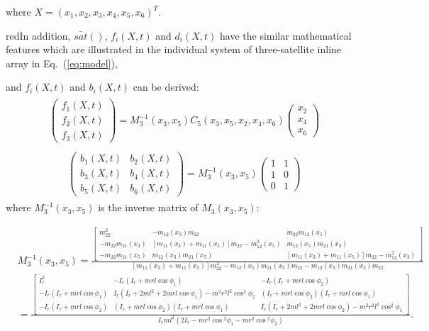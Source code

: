 where $X = (x_1,x_2,x_3,x_4,x_5,x_6)^T$. \begin{color}{red}In addition, $\bar{sat}()$, $f_i(X,t)$ and $d_i(X,t)$ have the similar mathematical features which are illustrated in the individual system of three-satellite inline array in Eq.~(\ref{eq:model}),\end{color} and $f_i(X,t)$ and $b_i(X,t)$ can be derived:
\begin{align}
\begin{split}
\begin{pmatrix}
f_1(X,t)\\
f_2(X,t)\\
f_3(X,t)
\end{pmatrix}=
M_3^{-1}(x_3,x_5)C_5(x_3,x_5,x_2,x_4,x_6)
\begin{pmatrix}
x_2\\
x_4\\
x_6
\end{pmatrix}
\end{split}
\end{align}
\begin{align}
\begin{split}
\begin{pmatrix}
b_1(X,t)&b_2(X,t)\\
b_3(X,t)&b_4(X,t)\\
b_5(X,t)&b_6(X,t)
\end{pmatrix}=
M_3^{-1}(x_3,x_5)
\begin{pmatrix}
1 &1\\
1 &0\\
0 &1
\end{pmatrix}
\end{split}
\end{align}
where $M_3^{-1}(x_3,x_5)$ is the inverse matrix of $M_3(x_3,x_5)$:
\begin{footnotesize}
\begin{align*}
&M_3^{-1}(x_3,x_5)
=\frac{\begin{bmatrix}
m_{22}^2 &-m_{12}(x_3)m_{22} &m_{22}m_{12}(x_5)\\
-m_{22}m_{21}(x_3) &[m_{11}(x_3)+m_{11}(x_5)]m_{22}-m_{12}^2(x_5) &m_{12}(x_5)m_{21}(x_3)\\
-m_{22}m_{21}(x_5) &m_{12}(x_3)m_{21}(x_5) &[m_{11}(x_3)+m_{11}(x_5)]m_{22}-m_{12}^2(x_3)
\end{bmatrix}}{[m_{11}(x_3)+m_{11}(x_5)]m_{22}^2-m_{12}(x_5)m_{21}(x_5)m_{22}-m_{12}(x_3)m_{21}(x_3)m_{22}}\\
&=\frac{\begin{bmatrix}
I_r^2 &-I_r(I_r+mrl\cos\phi_1) &-I_r(I_r+mrl\cos\phi_2)\\
-I_r(I_r+mrl\cos\phi_1) &I_r(I_r+2ml^2+2mrl\cos\phi_1)-m^2r^2l^2\cos^2\phi_2 &(I_r+mrl\cos\phi_2)(I_r+mrl\cos\phi_1)\\
-I_r(I_r+mrl\cos\phi_2) &(I_r+mrl\cos\phi_2)(I_r+mrl\cos\phi_1) &I_r(I_r+2ml^2+2mrl\cos\phi_2)-m^2r^2l^2\cos^2\phi_1
\end{bmatrix}}{I_rml^2(2I_r-mr^2\cos{^2\phi_1}-mr^2\cos{^2\phi_2})}.
\end{align*}
\end{footnotesize}\par
